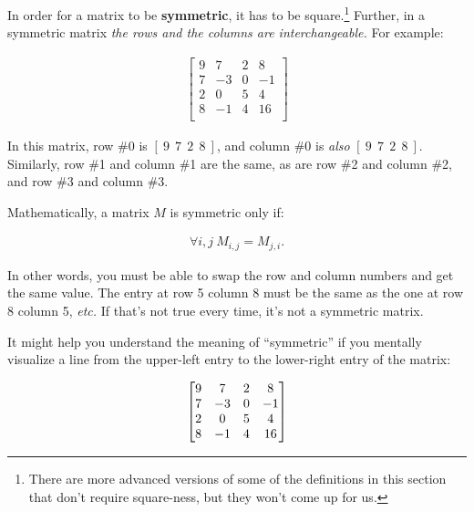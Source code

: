 \medskip


In order for a matrix to be \textbf{symmetric}, it has to be
square.\footnote{There are more advanced versions of some of the definitions in
this section that don't require square-ness, but they won't come up for us.}
Further, in a symmetric matrix \textit{the rows and the columns are
interchangeable.} For example:

\vspace{-.15in}
\begin{align*}
\begin{bmatrix}
9 & 7 & 2 & 8\\
7 & -3 & 0 & -1\\
2 & 0 & 5 & 4 \\
8 & -1 & 4 & 16 \\
\end{bmatrix}
\end{align*}
\vspace{-.15in}

In this matrix, row \#0 is $[\ 9\ \ 7\ \ 2\ \ 8\ ]$, and column \#0 is
\textit{also} $[\ 9\ \ 7\ \ 2\ \ 8\ ]$. Similarly, row \#1 and column \#1 are
the same, as are row \#2 and column \#2, and row \#3 and column \#3.

Mathematically, a matrix $M$ is symmetric only if:

\vspace{-.15in}
\begin{align*}
\forall i,j \ M_{i,j} = M_{j,i}.
\end{align*}
\vspace{-.15in}

In other words, you must be able to swap the row and column numbers and get the
same value. The entry at row 5 column 8 must be the same as the one at row 8
column 5, \textit{etc.} If that's not true every time, it's not a symmetric
matrix.

It might help you understand the meaning of ``symmetric'' if you mentally
visualize a line from the upper-left entry to the lower-right entry of the
matrix:

\vspace{-.15in}
\begin{align*}
\begin{bmatrix} \tikzmark{a}
9 & 7 & 2 & 8\\
7 & -3 & 0 & -1\\
2 & 0 & 5 & 4 \\
8 & -1 & 4 & 16 \tikzmark{b} \\
\end{bmatrix}
\end{align*}
\vspace{-.15in}

